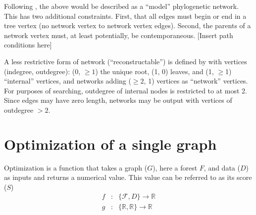 \documentclass[12pt]{article}
\begin{document}
Following \cite{moretetal2004}, the above would be described as a ``model'' phylogenetic network.
This has two additional constraints.
First, that all edges must begin or end in a tree vertex (no network vertex to network vertex edges).  
Second,  the parents of a network vertex must, at least potentially, be contemporaneous. 
[Insert path conditions here]  
 
A less restrictive form of network (``reconstructable'') is defined by \cite{moretetal2004} with vertices (indegree, outdegree): 
(0, $\ge 1$) the unique root, (1, 0) leaves, and (1, $\ge$1) ``internal'' vertices, and networks adding ($\ge 2$, 1) vertices as ``network'' vertices.  For purposes of searching, outdegree of internal nodes is restricted to at most 2. Since edges may have zero length, networks may be output with vertices of outdegree $> 2$.


\section{Optimization of a single graph}\label{Optimization of a single graph}

Optimization is a function that takes a graph ($G$), here a forest $F$, and data ($D$) as inputs and returns a numerical value.  
This value can be referred to as its score ($S$)
\begin{eqnarray*}
	f & : &  \{\mathcal{F}, D\} \rightarrow \mathbb{R}\\
	g & : & \{  \mathbb{R},  \mathbb{R} \} \rightarrow \mathbb{R}
\end{eqnarray*}
\end{document}
